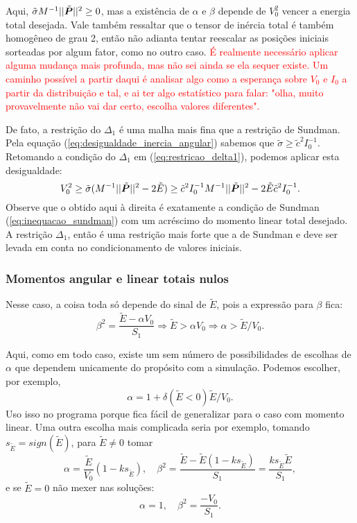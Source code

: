 Aqui, $\tilde \sigma M^{-1} ||\tilde{\bm P}||^2 \geq 0$, mas a existência de $\alpha$ e $\beta$ depende de $V_0^2$ vencer a energia total desejada. Vale também ressaltar que o tensor de inércia total é também homogêneo de grau 2, então não adianta tentar reescalar as posições iniciais sorteadas por algum fator, como no outro caso. \textcolor{red}{É realmente necessário aplicar alguma mudança mais profunda, mas não sei ainda se ela sequer existe. Um caminho possível a partir daqui é analisar algo como a esperança sobre $V_0$ e $I_0$ a partir da distribuição e tal, e ai ter algo estatístico para falar: "olha, muito provavelmente não vai dar certo, escolha valores diferentes".}

De fato, a restrição do $\Delta_1$ é uma malha mais fina que a restrição de Sundman. Pela equação (\ref{eq:desigualdade_inercia_angular}) sabemos que $\tilde \sigma \geq \tilde c^2 I_0^{-1}$. Retomando a condição do $\Delta_1$ em (\ref{eq:restricao_delta1}), podemos aplicar esta desigualdade:
\begin{equation}\label{eq:desigualdade_generalizada}
    V_0^2 \geq \tilde \sigma (M^{-1} ||\tilde{\bm P}||^2 - 2 \tilde E)
    \geq \tilde c^2 I_0^{-1} M^{-1} ||\tilde{\bm P}||^2 - 2 \tilde E \tilde c^2 I_0^{-1}.
\end{equation}
Observe que o obtido aqui à direita é exatamente a condição de Sundman (\ref{eq:inequacao_sundman}) com um acréscimo do momento linear total desejado. A restrição $\Delta_1$, então é uma restrição mais forte que a de Sundman e deve ser levada em conta no condicionamento de valores iniciais.
 
\subsubsection{Momentos angular e linear totais nulos}\label{subsubsection:j_p_nulos}
Nesse caso, a coisa toda só depende do sinal de $\tilde E$, pois a expressão para $\beta$ fica:
\begin{equation}
    \beta^2 = \dfrac{\tilde E - \alpha V_0}{S_1}
    \Rightarrow
    \tilde E > \alpha V_0 \Rightarrow \alpha > \tilde E / V_0.
\end{equation}

Aqui, como em todo caso, existe um sem número de possibilidades de escolhas de $\alpha$ que dependem unicamente do propósito com a simulação. Podemos escolher, por exemplo,
\begin{equation}
    \alpha = 1 + \delta(\tilde E < 0) \tilde E / V_0.
\end{equation}
Uso isso no programa porque fica fácil de generalizar para o caso com momento linear. Uma outra escolha mais complicada seria por exemplo, tomando $s_{\tilde E} = sign(\tilde E)$, para $\tilde E \neq 0$ tomar
\begin{equation}
    \alpha = \dfrac{\tilde E}{V_0} (1 - k s_{\tilde E}),
    \quad
    \beta^2 = \dfrac{\tilde E - \tilde E (1 - k s_{\tilde E})}{S_1} = \dfrac{k s_{\tilde E} \tilde E}{S_1},
\end{equation}
e se $\tilde E = 0$ não mexer nas soluções:
\begin{equation}
    \alpha = 1, \quad \beta^2 = \dfrac{- V_0}{S_1}.
\end{equation}

